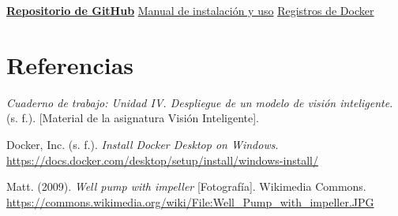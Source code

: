 \documentclass[11pt,letterpaper]{article}
\newcommand{\LigaRepositorio}{https://github.com/Erick5218/vision-inteligente-bombas-4-2-4-3}
\begin{document}
\href{\LigaRepositorio}{\textbf{Repositorio de GitHub}}\quad
\href{\LigaRepositorio/blob/main/README.md}{Manual de instalación y uso}\quad
\href{\LigaRepositorio/tree/main/evidencia_docker/20261126_045303_2304}{Registros de Docker}

\section*{Referencias}

{\small
\hangindent=0.7cm
\textit{Cuaderno de trabajo: Unidad IV. Despliegue de un modelo de visión inteligente}. (s. f.). [Material de la asignatura Visión Inteligente].\par
\hangindent=0.7cm
Docker, Inc. (s. f.). \textit{Install Docker Desktop on Windows}. \url{https://docs.docker.com/desktop/setup/install/windows-install/}\par
\hangindent=0.7cm
Matt. (2009). \textit{Well pump with impeller} [Fotografía]. Wikimedia Commons. \url{https://commons.wikimedia.org/wiki/File:Well_Pump_with_impeller.JPG}\par
}
\end{document}
